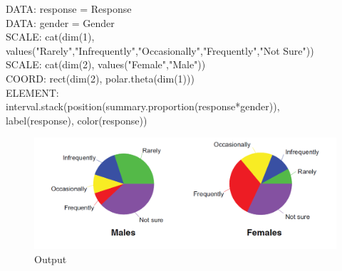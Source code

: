 \documentclass[12pt]{article}
\begin{document}
DATA: response = Response\\
DATA: gender = Gender\\
SCALE: cat(dim(1),\\
values("Rarely","Infrequently","Occasionally","Frequently","Not Sure"))\\
SCALE: cat(dim(2), values("Female","Male"))\\
COORD: rect(dim(2), polar.theta(dim(1)))\\
ELEMENT:\\ interval.stack(position(summary.proportion(response*gender)),\\
label(response), color(response))
\begin{figure}[h!]
\caption{Output}
\includegraphics[width=\textwidth]{pic/pre8}
\end{figure}

\newpage
\end{document}
